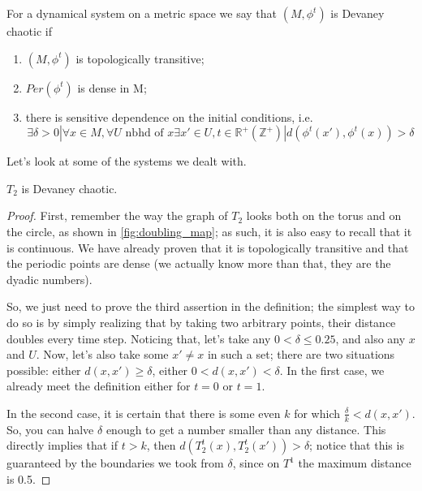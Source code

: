 \begin{definition}
    For a dynamical system on a metric space we say that $(M, \phi^t)$ is Devaney chaotic if\begin{enumerate}
        \item $(M, \phi^t)$ is topologically transitive;
        \item $Per(\phi^t)$ is dense in M;
        \item there is sensitive dependence on the initial conditions, i.e. \begin{equation*}
            \exists \delta>0 | \forall x\in M, \forall U \text{ nbhd of } x \exists x'\in U, t\in\mathbb{R}^+(\mathbb{Z}^+) | d(\phi^t(x'), \phi^t(x))>\delta
        \end{equation*}
    \end{enumerate}
\end{definition}

Let's look at some of the systems we dealt with.

\begin{proposition}
    $T_2$ is Devaney chaotic.
\end{proposition}
\begin{proof}
    First, remember the way the graph of $T_2$ looks both on the torus and on the circle, as shown in \autoref{fig:doubling_map}; as such, it is also easy to recall that it is continuous. We have already proven that it is topologically transitive and that the periodic points are dense (we actually know more than that, they are the dyadic numbers). 

    So, we just need to prove the third assertion in the definition; the simplest way to do so is by simply realizing that by taking two arbitrary points, their distance doubles every time step. Noticing that, let's take any $0<\delta\leq0.25$, and also any $x$ and $U$. Now, let's also take some $x'\neq x$ in such a set; there are two situations possible: either $d(x, x')\geq\delta$, either $0<d(x, x')<\delta$. In the first case, we already meet the definition either for $t=0$ or $t=1$. 

    In the second case, it is certain that there is some even $k$ for which $\frac{\delta}{k}<d(x, x')$. So, you can halve $\delta$ enough to get a number smaller than any distance. This directly implies that if $t>k$, then $d(T_2^t(x), T_2^t(x'))>\delta$; notice that this is guaranteed by the boundaries we took from $\delta$, since on $T^1$ the maximum distance is 0.5.
\end{proof}


